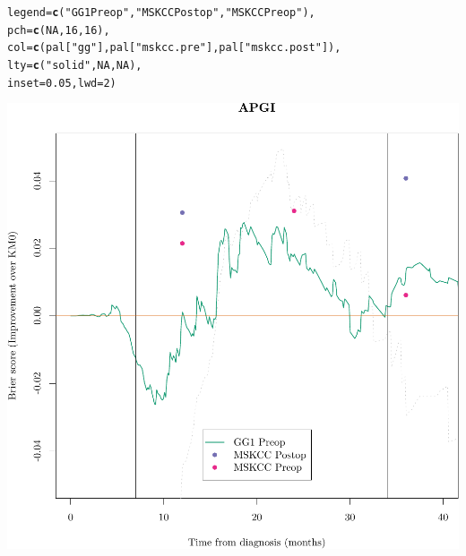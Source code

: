 \documentclass{article}\usepackage[]{graphicx}\usepackage[]{color}
\makeatletter
\def\maxwidth{ %
  \ifdim\Gin@nat@width>\linewidth
    \linewidth
  \else
    \Gin@nat@width
  \fi
}
\newcommand{\hlnum}[1]{\textcolor[rgb]{0.686,0.059,0.569}{#1}}%
\newcommand{\hlstr}[1]{\textcolor[rgb]{0.192,0.494,0.8}{#1}}%
\newcommand{\hlstd}[1]{\textcolor[rgb]{0.345,0.345,0.345}{#1}}%
\newcommand{\hlkwc}[1]{\textcolor[rgb]{0.333,0.667,0.333}{#1}}%
\newcommand{\hlkwd}[1]{\textcolor[rgb]{0.737,0.353,0.396}{\textbf{#1}}}%
\newenvironment{kframe}{%
 \def\at@end@of@kframe{}%
 \ifinner\ifhmode%
  \def\at@end@of@kframe{\end{minipage}}%
  \begin{minipage}{\columnwidth}%
 \fi\fi%
 \def\FrameCommand##1{\hskip\@totalleftmargin \hskip-\fboxsep
 \colorbox{shadecolor}{##1}\hskip-\fboxsep
     \hskip-\linewidth \hskip-\@totalleftmargin \hskip\columnwidth}%
 \MakeFramed {\advance\hsize-\width
   \@totalleftmargin\z@ \linewidth\hsize
   \@setminipage}}%
 {\par\unskip\endMakeFramed%
 \at@end@of@kframe}
\newenvironment{knitrout}{}{} %
\makeatother
\begin{document}
\begin{knitrout}
\begin{kframe}
\begin{alltt}
        \hlkwc{legend} \hlstd{=} \hlkwd{c}\hlstd{(}     \hlstr{"GG1 Preop"}\hlstd{,}    \hlstr{"MSKCC Postop"}\hlstd{,}         \hlstr{"MSKCC Preop"}\hlstd{),}
        \hlkwc{pch} \hlstd{=} \hlkwd{c}\hlstd{(}        \hlnum{NA}\hlstd{,}                     \hlnum{16}\hlstd{,}                             \hlnum{16}\hlstd{),}
        \hlkwc{col} \hlstd{=} \hlkwd{c}\hlstd{(        pal[}\hlstr{"gg"}\hlstd{],              pal[}\hlstr{"mskcc.pre"}\hlstd{],       pal[}\hlstr{"mskcc.post"}\hlstd{]),}
        \hlkwc{lty} \hlstd{=} \hlkwd{c}\hlstd{(}        \hlstr{"solid"}\hlstd{,}                \hlnum{NA}\hlstd{,}                             \hlnum{NA}\hlstd{),}
        \hlkwc{inset} \hlstd{=} \hlnum{0.05}\hlstd{,} \hlkwc{lwd} \hlstd{=} \hlnum{2}\hlstd{)}
\end{alltt}
\end{kframe}

{\centering \includegraphics[width=\maxwidth]{figure/07-prob-bs-paths-plot-apgi-4} 

}



\end{knitrout}
\end{document}
